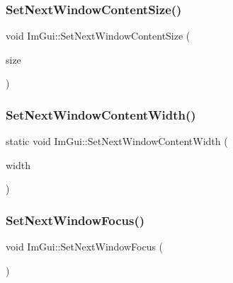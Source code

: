 \hypertarget{namespace_im_gui_aae55a58c38d8e84b10eb1e8b1531372d}{}\label{namespace_im_gui_aae55a58c38d8e84b10eb1e8b1531372d} 
\subsubsection{\texorpdfstring{Set\+Next\+Window\+Content\+Size()}{SetNextWindowContentSize()}}
{\footnotesize\ttfamily void Im\+Gui\+::\+Set\+Next\+Window\+Content\+Size (\begin{DoxyParamCaption}\item[{const \hyperlink{struct_im_vec2}{Im\+Vec2} \&}]{size }\end{DoxyParamCaption})}

\hypertarget{namespace_im_gui_a5d492de86ca75e2b3b2eae112049e3ff}{}\label{namespace_im_gui_a5d492de86ca75e2b3b2eae112049e3ff} 
\subsubsection{\texorpdfstring{Set\+Next\+Window\+Content\+Width()}{SetNextWindowContentWidth()}}
{\footnotesize\ttfamily static void Im\+Gui\+::\+Set\+Next\+Window\+Content\+Width (\begin{DoxyParamCaption}\item[{float}]{width }\end{DoxyParamCaption})\hspace{0.3cm}{\ttfamily [static]}}

\hypertarget{namespace_im_gui_ac2d2b163c95cd8c8391aba85bc50d170}{}\label{namespace_im_gui_ac2d2b163c95cd8c8391aba85bc50d170} 
\subsubsection{\texorpdfstring{Set\+Next\+Window\+Focus()}{SetNextWindowFocus()}}
{\footnotesize\ttfamily void Im\+Gui\+::\+Set\+Next\+Window\+Focus (\begin{DoxyParamCaption}{ }\end{DoxyParamCaption})}

